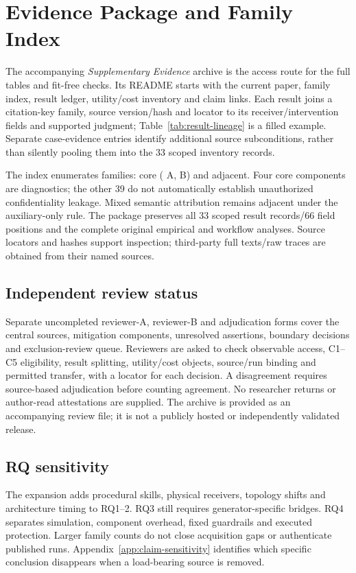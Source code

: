 \section{Evidence Package and Family Index}\label{app:final-ledger}
The accompanying \emph{Supplementary Evidence} archive is the access route for the full tables and fit-free checks. Its README starts with the current paper, family index, result ledger, utility/cost inventory and claim links. Each result joins a citation-key family, source version/hash and locator to its receiver/intervention fields and supported judgment; Table~\ref{tab:result-lineage} is a filled example. Separate case-evidence entries identify additional source subconditions, rather than silently pooling them into the 33 scoped inventory records.

The index enumerates \FinalN{} families: \FinalCore{} core (\FinalA{} A, \FinalB{} B) and \FinalAdjacent{} adjacent. Four core components are diagnostics; the other 39 do not automatically establish unauthorized confidentiality leakage. Mixed semantic attribution remains adjacent under the auxiliary-only rule. The package preserves all 33 scoped result records/66 field positions and the complete original empirical and workflow analyses. Source locators and hashes support inspection; third-party full texts/raw traces are obtained from their named sources.

\subsection{Independent review status}
Separate uncompleted reviewer-A, reviewer-B and adjudication forms cover the central sources, mitigation components, unresolved assertions, boundary decisions and exclusion-review queue. Reviewers are asked to check observable access, C1--C5 eligibility, result splitting, utility/cost objects, source/run binding and permitted transfer, with a locator for each decision. A disagreement requires source-based adjudication before counting agreement. No researcher returns or author-read attestations are supplied. The archive is provided as an accompanying review file; it is not a publicly hosted or independently validated release.

\subsection{RQ sensitivity}\label{app:rq-sensitivity}
The expansion adds procedural skills, physical receivers, topology shifts and architecture timing to RQ1--2. RQ3 still requires generator-specific bridges. RQ4 separates simulation, component overhead, fixed guardrails and executed protection. Larger family counts do not close acquisition gaps or authenticate published runs. Appendix~\ref{app:claim-sensitivity} identifies which specific conclusion disappears when a load-bearing source is removed.
